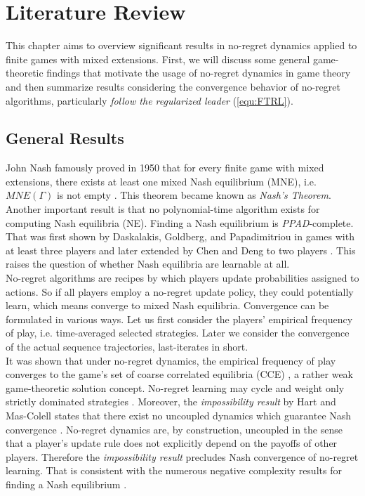 
\chapter{Literature Review}\label{chapter:literatureReview}

This chapter aims to overview significant results in no-regret dynamics applied to finite games with mixed extensions. First, we will discuss some general game-theoretic findings that motivate the usage of no-regret dynamics in game theory and then summarize results considering the convergence behavior of no-regret algorithms, particularly \textit{follow the regularized leader} (\ref{equ:FTRL}). \\

\section{General Results}\label{section:generalResults}

John Nash famously proved in 1950 that for every finite game with mixed extensions, there exists at least one mixed Nash equilibrium (MNE), i.e. $MNE(\Gamma)$ is not empty \cite{nash}. This theorem became known as \textit{Nash's Theorem}. Another important result is that no polynomial-time algorithm exists for computing Nash equilibria (NE). Finding a Nash equilibrium is \textit{PPAD}-complete. That was first shown by Daskalakis, Goldberg, and Papadimitriou in games with at least three players \cite{daskalakis} and later extended by Chen and Deng to two players \cite{chen}. This raises the question of whether Nash equilibria are learnable at all. \\

No-regret algorithms are recipes by which players update probabilities assigned to actions. So if all players employ a no-regret update policy, they could potentially learn, which means converge to mixed Nash equilibria. Convergence can be formulated in various ways. Let us first consider the players' empirical frequency of play, i.e. time-averaged selected strategies. Later we consider the convergence of the actual sequence trajectories, last-iterates in short.\\

It was shown that under no-regret dynamics, the empirical frequency of play converges to the game's set of coarse correlated equilibria (CCE) \cite{flokas}, a rather weak game-theoretic solution concept. No-regret learning may cycle and weight only strictly dominated strategies \cite{mertikopoulos}. Moreover, the \textit{impossibility result} by Hart and Mas-Colell states that there exist no uncoupled dynamics which guarantee Nash convergence \cite{hart}. No-regret dynamics are, by construction, uncoupled in the sense that a player’s update rule does not explicitly depend on the payoffs of other players. Therefore the \textit{impossibility result} precludes Nash convergence of no-regret learning. That is consistent with the numerous negative complexity results for finding a Nash equilibrium \cite{chen, daskalakis}. \\


